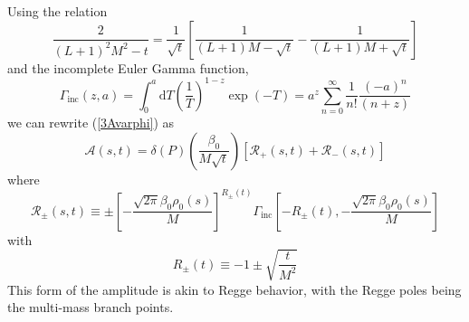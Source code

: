 Using the relation
\begin{equation}
	\frac{2}{(L+1)^{2} M^{2} - t} = \frac{1}{\sqrt{t}} \left[ \frac{1}{(L+1)M - \sqrt{t}} - \frac{1}{(L+1)M + \sqrt{t}} \right]
\end{equation}
and the incomplete Euler Gamma function,
\begin{equation}
	\Gamma_{\text{inc}}(z, a) = \int_{0}^{a} \mathrm{d}T \left( \frac{1}{T} \right)^{1-z} \exp{(-T)} = a^{z} \sum_{n = 0}^{\infty} \frac{1}{n!} \frac{(-a)^{n}}{(n + z)}
\end{equation}
we can rewrite (\ref{3Avarphi}) as
\begin{equation}
	\mathcal{A}(s, t) = \delta(P) \left( \frac{\beta_{0}}{M \sqrt{t}} \right) \left[ \mathcal{R}_{+}(s, t) + \mathcal{R}_{-}(s, t) \right]
\end{equation}
where
\begin{equation}
	\mathcal{R}_{\pm}(s, t) \equiv \pm \left[ - \frac{\sqrt{2 \pi} \beta_{0} \rho_{0}(s)}{M} \right]^{R_{\pm}(t)} \Gamma_{\text{inc}}\left[ -R_{\pm}(t),  - \frac{\sqrt{2 \pi} \beta_{0} \rho_{0}(s)}{M} \right] \label{615}
\end{equation}
with
\begin{equation}
	R_{\pm}(t) \equiv -1 \pm \sqrt{\frac{t}{M^{2}}}
\end{equation}
This form of the amplitude is akin to Regge behavior, with the Regge poles being the multi-mass branch points.
